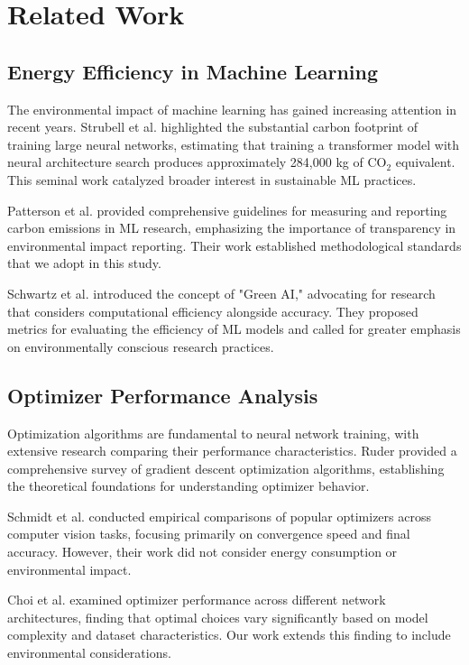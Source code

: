 \documentclass[conference]{IEEEtran}
\begin{document}
\section{Related Work}

\subsection{Energy Efficiency in Machine Learning}

The environmental impact of machine learning has gained increasing attention in recent years. Strubell et al. \cite{strubell2019energy} highlighted the substantial carbon footprint of training large neural networks, estimating that training a transformer model with neural architecture search produces approximately 284,000 kg of CO$_2$ equivalent. This seminal work catalyzed broader interest in sustainable ML practices.

Patterson et al. \cite{patterson2021carbon} provided comprehensive guidelines for measuring and reporting carbon emissions in ML research, emphasizing the importance of transparency in environmental impact reporting. Their work established methodological standards that we adopt in this study.

Schwartz et al. \cite{schwartz2020green} introduced the concept of "Green AI," advocating for research that considers computational efficiency alongside accuracy. They proposed metrics for evaluating the efficiency of ML models and called for greater emphasis on environmentally conscious research practices.

\subsection{Optimizer Performance Analysis}

Optimization algorithms are fundamental to neural network training, with extensive research comparing their performance characteristics. Ruder \cite{ruder2016overview} provided a comprehensive survey of gradient descent optimization algorithms, establishing the theoretical foundations for understanding optimizer behavior.

Schmidt et al. \cite{schmidt2021descending} conducted empirical comparisons of popular optimizers across computer vision tasks, focusing primarily on convergence speed and final accuracy. However, their work did not consider energy consumption or environmental impact.

Choi et al. \cite{choi2019empirical} examined optimizer performance across different network architectures, finding that optimal choices vary significantly based on model complexity and dataset characteristics. Our work extends this finding to include environmental considerations.
\end{document}
